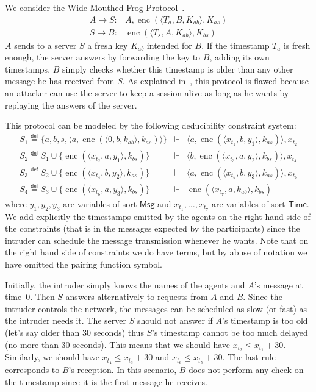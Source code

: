 \documentclass[acmtocl,acmnow]{acmtrans2m}
\newcommand{\enc}{\operatorname{enc}}
\newcommand{\term}{\mathsf{Msg}}
\newcommand{\Time}{\mathsf{Time}}
\newcommand{\eqdef}{\stackrel{\mathsf{def}}{=}}
\newcommand{\dedsys}[1]{deducibility constraint system}
\begin{document}
\begin{example}
We consider the Wide Mouthed Frog Protocol~\cite{CJ97}.
\[
\begin{array}{rl}
A \rightarrow S: & A, \enc(\langle T_a, B, K_{ab}\rangle,K_{as})\\
S \rightarrow B: & \enc(\langle T_s, A, K_{ab}\rangle,K_{bs})
\end{array}
\]
$A$ sends to a server $S$ a fresh key $K_{ab}$ intended for $B$. If the timestamp $T_a$ is fresh enough, the
server answers by forwarding the key to $B$, adding its own timestamps. $B$ simply checks whether this
timestamp is older than any other message he has received from $S$. As explained in~\cite{CJ97}, this
protocol is flawed because an attacker can use the server to keep a session alive as long as he wants by
replaying the answers of the server.

This protocol can be modeled by the following \dedsys{}:
\begin{eqnarray}
S_1\eqdef \{a,b,s,\langle a, \enc(\langle 0, b, k_{ab}\rangle,k_{as})\rangle\}
& \Vdash &
\langle a, \enc(\langle x_{t_1}, b, y_1\rangle,k_{as})\rangle,x_{t_2}\\
S_2\eqdef S_1\cup\{\enc(\langle x_{t_2}, a, y_1\rangle,k_{bs})\}
& \Vdash & \langle b, \enc(\langle x_{t_3}, a, y_2\rangle,k_{bs})\rangle,x_{t_4}\\
S_3\eqdef S_2\cup\{\enc(\langle x_{t_4}, b, y_2\rangle,k_{as})\}
& \Vdash & \langle a, \enc(\langle x_{t_5}, b, y_3\rangle,k_{as})\rangle,x_{t_6}\\
S_4\eqdef S_3\cup\{\enc(\langle x_{t_6}, a, y_3\rangle,k_{bs})\}
& \Vdash & \enc(\langle x_{t_7}, a, k_{ab}\rangle,k_{bs})
\end{eqnarray}where $y_1,y_2,y_3$ are variables of sort $\term$ and $ x_{t_1},\dots,
x_{t_7}$ are variables of sort $\Time$. We add explicitly the
timestamps emitted by the agents on the right hand side of the
constraints (that is in the messages expected by the participants)
since the intruder can schedule the message transmission whenever he
wants. Note that on the right hand side of constraints we do have
terms, but by abuse of notation we have omitted the pairing function symbol.

Initially, the intruder simply knows the names of the agents and $A$'s message at time~0. Then $S$ answers
alternatively to requests from $A$ and $B$. Since the intruder controls the network, the messages can be
scheduled as slow (or fast) as the intruder needs it. The server $S$ should not answer
if $A$'s timestamp is too old (let's say older than 30 seconds) thus $S$'s timestamp cannot be too much
delayed (no more than 30 seconds). This means that we should have $x_{t_2}\leq x_{t_1}+30$. Similarly, we
should have $x_{t_4}\leq x_{t_3}+30$ and $x_{t_6}\leq x_{t_5}+30$. The last rule corresponds to $B$'s
reception. In this scenario, $B$ does not perform any check on the timestamp since it is the first message he
receives.


\end{example}
\end{document}
